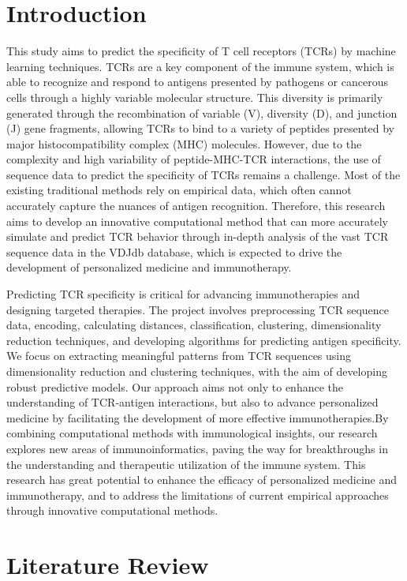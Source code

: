 \documentclass[conference]{IEEEtran}
\begin{document}
	\section{Introduction}
	This study aims to predict the specificity of T cell receptors (TCRs) by machine learning techniques. TCRs are a key component of the immune system, which is able to recognize and respond to antigens presented by pathogens or cancerous cells through a highly variable molecular structure. This diversity is primarily generated through the recombination of variable (V), diversity (D), and junction (J) gene fragments, allowing TCRs to bind to a variety of peptides presented by major histocompatibility complex (MHC) molecules. However, due to the complexity and high variability of peptide-MHC-TCR interactions, the use of sequence data to predict the specificity of TCRs remains a challenge. Most of the existing traditional methods rely on empirical data, which often cannot accurately capture the nuances of antigen recognition. Therefore, this research aims to develop an innovative computational method that can more accurately simulate and predict TCR behavior through in-depth analysis of the vast TCR sequence data in the VDJdb database, which is expected to drive the development of personalized medicine and immunotherapy.
	
	Predicting TCR specificity is critical for advancing immunotherapies and designing targeted therapies. The project involves preprocessing TCR sequence data, encoding, calculating distances, classification, clustering, dimensionality reduction techniques, and developing algorithms for predicting antigen specificity. We focus on extracting meaningful patterns from TCR sequences using dimensionality reduction and clustering techniques, with the aim of developing robust predictive models. Our approach aims not only to enhance the understanding of TCR-antigen interactions, but also to advance personalized medicine by facilitating the development of more effective immunotherapies.By combining computational methods with immunological insights, our research explores new areas of immunoinformatics, paving the way for breakthroughs in the understanding and therapeutic utilization of the immune system. This research has great potential to enhance the efficacy of personalized medicine and immunotherapy, and to address the limitations of current empirical approaches through innovative computational methods.
	
	\section{Literature Review}
	
\end{document}

